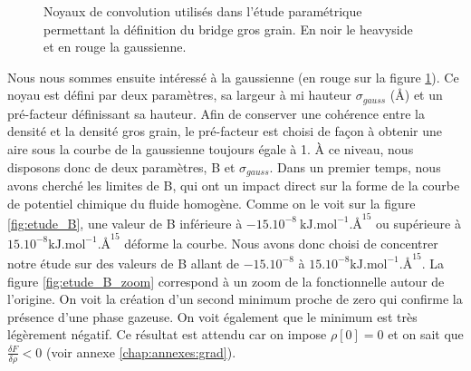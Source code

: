 
\begin{figure}[h]
    \center    
    \caption[Noyaux de convolution utilisés dans l'étude paramétrique permettant la définition du bridge gros grain.]{Noyaux de convolution utilisés dans l'étude paramétrique permettant la définition du bridge gros grain. En noir le heavyside et en rouge la gaussienne.}
    \label{fig:noyaux}
\end{figure}



Nous nous sommes ensuite intéressé à la gaussienne (en rouge sur la figure \ref{fig:noyaux}).
Ce noyau est défini par deux paramètres, sa largeur à mi hauteur $\sigma_{gauss}$ (\AA) et un pré-facteur définissant sa hauteur.
Afin de conserver une cohérence entre la densité et la densité gros grain, le pré-facteur est choisi de façon à obtenir une aire sous la courbe de la gaussienne toujours égale à 1.
\`A ce niveau, nous disposons donc de deux paramètres, B et $\sigma_{gauss}$.
Dans un premier temps, nous avons cherché les limites de B, qui ont un impact direct sur la forme de la courbe de potentiel chimique du fluide homogène.
Comme on le voit sur la figure \ref{fig:etude_B}, une valeur de B inférieure à $-15.10^{-8}\  \mathrm{kJ.mol}^{-1}.\text{\AA}^{15}$ ou supérieure à $15.10^{-8} \mathrm{kJ.mol}^{-1}.\text{\AA}^{15}$ déforme la courbe.
Nous avons donc choisi de concentrer notre étude sur des valeurs de B allant de $-15.10^{-8}$ à $15.10^{-8} \mathrm{kJ.mol}^{-1}.\text{\AA}^{15}$.
La figure \ref{fig:etude_B_zoom} correspond à un zoom de la fonctionnelle autour de l'origine. On voit la création d'un second minimum proche de zero qui confirme la présence d'une phase gazeuse. On voit également que le minimum est très légèrement négatif. Ce résultat est attendu car on impose $\rho[0]=0$ et on sait que $\frac{\delta F}{\delta \rho}<0$ (voir annexe \ref{chap:annexes:grad}).

